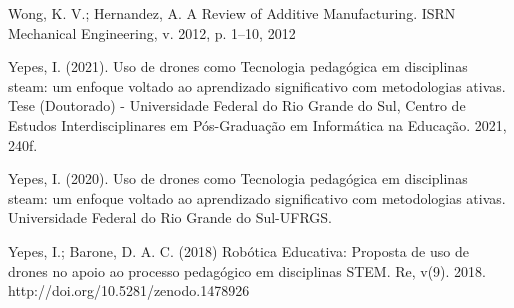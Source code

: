\documentclass[conference]{IEEEtran}
\begin{document}
\begin{thebibliography}{00}
 Wong, K. V.; Hernandez, A. A Review of Additive Manufacturing. ISRN Mechanical Engineering, v. 2012, p. 1–10, 2012

 Yepes, I. (2021). Uso de drones como Tecnologia pedagógica em disciplinas steam: um enfoque voltado ao aprendizado significativo com metodologias ativas. Tese (Doutorado) - Universidade Federal do Rio Grande do Sul, Centro de Estudos Interdisciplinares em Pós-Graduação em Informática na Educação. 2021, 240f. 

 Yepes, I. (2020). Uso de drones como Tecnologia pedagógica em disciplinas steam: um enfoque voltado ao aprendizado significativo com metodologias
ativas. Universidade Federal do Rio Grande do Sul-UFRGS.

 Yepes, I.; Barone, D. A. C. (2018) Robótica Educativa: Proposta de uso de drones no apoio ao processo pedagógico em disciplinas STEM. Re, v(9). 2018. http://doi.org/10.5281/zenodo.1478926

\end{thebibliography}
\end{document}
